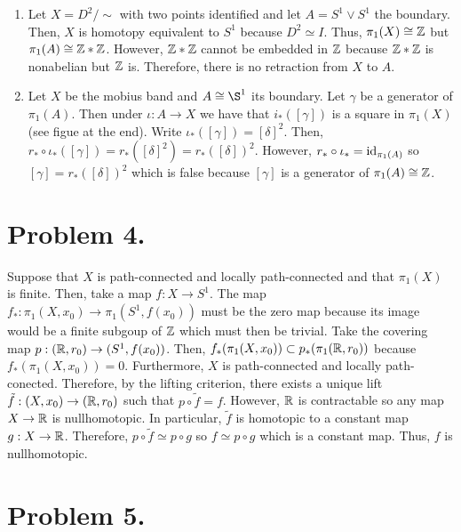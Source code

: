 \documentclass[12pt]{extarticle}
\begin{document}
\begin{enumerate}
\item Let $X = D^2/ \sim$ with two points identified and let $A = S^1 \vee S^1$ the boundary. Then, $X$ is homotopy equivalent to $S^1$ because $D^2 \simeq I$. Thus, $\pi_1(X) \cong \mathbb{Z}$ but $\pi_1(A) \cong \mathbb{Z} * \mathbb{Z}$. However, $\mathbb{Z} * \mathbb{Z}$ cannot be embedded in $\mathbb{Z}$ because $\mathbb{Z} * \mathbb{Z}$ is nonabelian but $\mathbb{Z}$ is. Therefore, there is no retraction from $X$ to $A$. 

\item Let $X$ be the mobius band and $A \cong \S^1$ its boundary. Let $\gamma$ be a generator of $\pi_1(A)$. Then under $\iota : A \to X$ we have that $i_*([\gamma])$ is a square in $\pi_1(X)$ (see figue at the end). Write $\iota_*([\gamma]) = [\delta]^2$. Then, $r_* \circ \iota_*([\gamma]) = r_*([\delta]^2) = r_*([\delta])^2$. However, $r_* \circ \iota_* = \mathrm{id}_{\pi_1(A)}$ so $[\gamma] = r_*([\delta])^2$ which is false because $[\gamma]$ is a generator of $\pi_1(A) \cong \mathbb{Z}$.   
\end{enumerate}

\section*{Problem 4.}   

Suppose that $X$ is path-connected and locally path-connected and that $\pi_1(X)$ is finite. Then, take a map $f : X \to S^1$. The map $f_* : \pi_1(X, x_0) \to \pi_1(S^1, f(x_0))$ must be the zero map because its image would be a finite subgoup of $\mathbb{Z}$ which must then be trivial. Take the covering map $p : (\mathbb{R}, r_0) \to (S^1, f(x_0))$. Then, $f_*(\pi_1(X, x_0)) \subset p_*(\pi_1(\mathbb{R}, r_0))$ because $f_*(\pi_1(X, x_0)) = 0$. Furthermore, $X$ is path-connected and locally path-conected. Therefore, by the lifting criterion, there exists a unique lift $\tilde{f} : (X, x_0) \to (\mathbb{R}, r_0)$ such that $p \circ \tilde{f} = f$. However, $\mathbb{R}$ is contractable so any map $X \to \mathbb{R}$ is nullhomotopic. In particular, $\tilde{f}$ is homotopic to a constant map $g : X \to \mathbb{R}$. Therefore, $p \circ \tilde{f} \simeq p \circ g$ so $f \simeq p \circ g$ which is a constant map. Thus, $f$ is nullhomotopic. 

\section*{Problem 5.}
\end{document}
